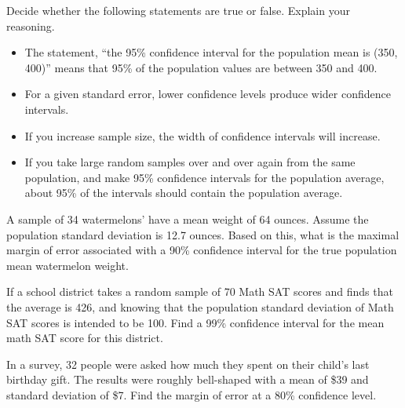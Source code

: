 \begin{exercise}

Decide whether the following statements are true or false. Explain your
reasoning.

\begin{itemize}
\item
  The statement, ``the 95\% confidence interval for the population mean
  is (350, 400)'' means that 95\% of the population values are between
  350 and 400.
\item
  For a given standard error, lower confidence levels produce wider
  confidence intervals.
\item
  If you increase sample size, the width of confidence intervals will
  increase.
\item
  If you take large random samples over and over again from the same
  population, and make 95\% confidence intervals for the population
  average, about 95\% of the intervals should contain the population
  average.
\end{itemize}
\end{exercise}

\begin{exercise}

A sample of 34 watermelons' have a mean weight of 64 ounces. Assume the
population standard deviation is 12.7 ounces. Based on this, what is the
maximal margin of error associated with a 90\% confidence interval for
the true population mean watermelon weight.

\end{exercise}
\vspace*{8\baselineskip}

\begin{exercise}

If a school district takes a random sample of 70 Math SAT scores and
finds that the average is 426, and knowing that the population standard
deviation of Math SAT scores is intended to be 100. Find a 99\%
confidence interval for the mean math SAT score for this district.

\end{exercise}
\vspace*{8\baselineskip}

\begin{exercise}

In a survey, 32 people were asked how much they spent on their child's
last birthday gift. The results were roughly bell-shaped with a mean of
\$39 and standard deviation of \$7. Find the margin of error at a 80\%
confidence level.

\end{exercise}
\vspace*{8\baselineskip}

